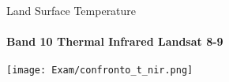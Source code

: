 \documentclass{beamer}  %
\begin{document}
\begin{frame}[fragile]{Land Surface Temperature}
    \framesubtitle{Band 10 Thermal Infrared Landsat 8-9}
            \centering
\texttt{[image: Exam/confronto\_t\_nir.png]}   
\vspace{0.5cm}                
\end{frame}





\end{document}
